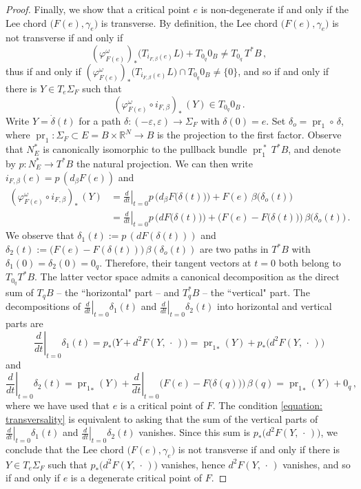 \documentclass[10pt,a4paper]{amsart}
\DeclareMathOperator{\pr}{pr}
\begin{document}
\begin{proof}
Finally,
we show that a critical point $e$ is non-degenerate
if and only if the Lee chord $\big( F(e), \gamma_e \big)$ is transverse.
By definition,
the Lee chord $\big( F(e), \gamma_e \big)$ is not transverse
if and only if
\[
(\varphi_{F(e)}^{\omega})_{\ast} \big(T_{i_{F, \beta}(e)} L \big)
+ T_{0_q} 0_B \neq T_{0_q} \, T^{\ast}B \,,
\]
thus if and only if
$(\varphi_{F(e)}^{\omega})_{\ast} \big(T_{i_{F, \beta}(e)} L \big)
\cap T_{0_q} 0_B \neq \{0\}$,
and so
if and only if there is $Y \in T_e \Sigma_F$
such that
\begin{equation}\label{equation: transversality}
(\varphi_{F(e)}^{\omega} \circ i_{F, \beta})_{\ast} \, (Y) \in T_{0_q} 0_B \,.
\end{equation}
Write $Y = \dot{\delta}(t)$
for a path $\delta: (-\varepsilon, \varepsilon) \to \Sigma_F$
with $\delta (0) = e$.
Set $\delta_o = \pr_1 \circ \,\delta$,
where $\pr_1 : \Sigma_F \subset E = B \times \mathbb{R}^N \to B$
is the projection to the first factor.
Observe that $N_E^*$ is canonically isomorphic
to the pullback bundle $\pr_1^{\,\ast}\, T^*B$,
and denote by $p: N_E^* \to T^*B$ the natural projection.
We can then write $i_{F,\beta} (e) = p \, (d_\beta F(e))$ and
\begin{align*}
(\varphi_{F(e)}^{\omega} \circ i_{F, \beta})_{\ast} \, (Y)
&=  \left. \frac{d}{dt} \right \lvert_{t=0}
p \, \Big( d_\beta F \big(\delta(t)\big) \Big) + F(e) \, \beta \big(\delta_o(t)\big) \\
&= \left.\frac{d}{dt} \right \lvert_{t=0}
p \, \Big( dF \big(\delta(t)\big) \Big)
+ \Big(F(e) - F \big(\delta(t)\big)\Big) \, \beta \big(\delta_o(t)\big) \,.
\end{align*}
We observe that $\delta_1 (t) := p \, \left(dF(\delta(t))\right)$
and $\delta_2 (t) := \big( F(e) - F(\delta(t)) \big) \, \beta(\delta_o(t))$
are two paths in $T^*B$ with $\delta_1 (0) = \delta_2(0) = 0_q$.
Therefore,
their tangent vectors at $t = 0$
both belong to $T_{0_q} T^*B$.
The latter vector space admits a canonical decomposition
as the direct sum of $T_q B$ -- the ``horizontal" part -- and $T^*_qB$ -- the ``vertical" part.
The decompositions of $\left. \frac{d}{dt} \right\lvert_{t=0} \delta_1(t)$
and $\left. \frac{d}{dt} \right\lvert_{t=0} \delta_2(t)$
into horizontal and vertical parts are
$$
\left.\frac{d}{dt}\right\lvert_{t=0} \delta_1 (t)
= p_{*} \big( Y + d^2F (Y, \,\cdot\,) \big)
= {\pr_1}_{*} (Y) + p_{\ast} \big( d^2F(Y, \,\cdot\,) \big)
$$
and
$$
\left.\frac{d}{dt}\right\lvert_{t=0} \delta_2 (t)
= {\pr_1}_{*} (Y) + \left.\frac{d}{dt}\right\lvert_{t=0}
\Big( F(e) - F \big(\delta(q)\big) \Big) \, \beta(q)
= {\pr_1}_{*} (Y) + 0_q \,,
$$
where we have used that $e$ is a critical point of $F$.
The condition \eqref{equation: transversality}
is equivalent to asking that the sum of the vertical parts
of $\left. \frac{d}{dt} \right\lvert_{t=0} \delta_1(t)$
and $\left. \frac{d}{dt} \right\lvert_{t=0} \delta_2(t)$
vanishes.
Since this sum
is $p_{\ast} \big(d^2F (Y, \,\cdot\,)\big)$,
we conclude that 
the Lee chord $\big( F(e), \gamma_e \big)$ is not transverse
if and only if there is $Y \in T_e\Sigma_F$
such that $p_{\ast} \big(d^2F (Y, \,\cdot\,)\big)$ vanishes,
hence $d^2F (Y, \,\cdot\,)$ vanishes,
and so if and only if $e$ is a degenerate critical point of $F$.
\end{proof}
\end{document}
